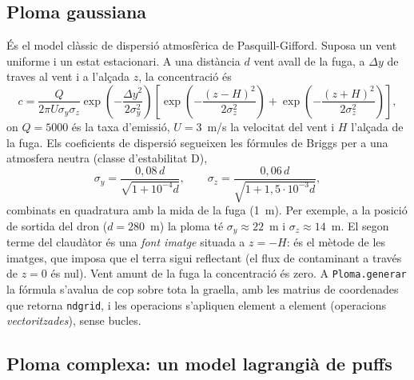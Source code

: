 \documentclass[11pt,a4paper]{article}
\begin{document}
\subsection{Ploma gaussiana}

És el model clàssic de dispersió atmosfèrica de Pasquill-Gifford. Suposa un vent uniforme i un estat estacionari. A una distància $d$ vent avall de la fuga, a $\Delta y$ de traves al vent i a l'alçada $z$, la concentració és
\begin{equation}
c = \frac{Q}{2\pi U \sigma_y \sigma_z} \exp\!\left(-\frac{\Delta y^2}{2\sigma_y^2}\right) \left[\exp\!\left(-\frac{(z-H)^2}{2\sigma_z^2}\right) + \exp\!\left(-\frac{(z+H)^2}{2\sigma_z^2}\right)\right],
\end{equation}
on $Q = 5000$ és la taxa d'emissió, $U = 3$~m/s la velocitat del vent i $H$ l'alçada de la fuga. Els coeficients de dispersió segueixen les fórmules de Briggs per a una atmosfera neutra (classe d'estabilitat D),
\begin{equation}
\sigma_y = \frac{0{,}08\, d}{\sqrt{1 + 10^{-4} d}}, \qquad \sigma_z = \frac{0{,}06\, d}{\sqrt{1 + 1{,}5 \cdot 10^{-3} d}},
\end{equation}
combinats en quadratura amb la mida de la fuga (1~m). Per exemple, a la posició de sortida del dron ($d = 280$~m) la ploma té $\sigma_y \approx 22$~m i $\sigma_z \approx 14$~m. El segon terme del claudàtor és una \emph{font imatge} situada a $z = -H$: és el mètode de les imatges, que imposa que el terra sigui reflectant (el flux de contaminant a través de $z = 0$ és nul). Vent amunt de la fuga la concentració és zero. A \texttt{Ploma.generar} la fórmula s'avalua de cop sobre tota la graella, amb les matrius de coordenades que retorna \texttt{ndgrid}, i les operacions s'apliquen element a element (operacions \emph{vectoritzades}), sense bucles.

\subsection{Ploma complexa: un model lagrangià de puffs}
\end{document}
